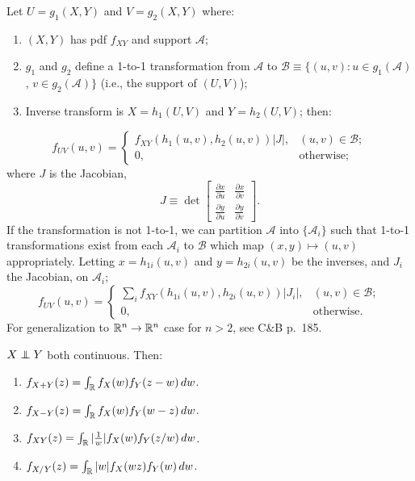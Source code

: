 \documentclass[8pt,letterpaper, landscape]{extarticle} %
\begin{document}
\begin{multicols}{3}
\begin{description}
 Let $ U = g_1 (X,Y) $ and $ V = g_2 (X,Y) $ where:
\begin{enumerate}
\item $ (X,Y) $ has pdf $ f_{XY} $ and support $ \mathcal{A} $;
\item $ g_1 $ and $ g_2 $ define a 1-to-1 transformation from $ \mathcal{A} $ to $ \mathcal{B} \equiv \{ (u,v) \colon u \in g_1(\mathcal{A}) $, $ v \in g_2(\mathcal{A}) \} $ (i.e., the support of $ (U,V) $);
\item Inverse transform is $ X = h_1 (U, V) $ and $ Y = h_2 (U, V) $; then:
\end{enumerate}
$$ f_{UV}(u, v) = \begin{cases}
f_{XY} (h_1(u, v), h_2(u, v)) \left| J \right| , & (u,v) \in \mathcal{B}; \\
0, & \text{otherwise;}
\end{cases} $$
where $ J $ is the Jacobian,
$$ J \equiv \operatorname{det} \begin{bmatrix}
\tfrac{\partial x}{\partial u} & \tfrac{\partial x}{\partial v} \\ 
\tfrac{\partial y}{\partial u} & \tfrac{\partial y}{\partial v}
\end{bmatrix} . $$
If the transformation is not 1-to-1, we can partition $ \mathcal{A} $ into $ \{ \mathcal{A}_i \} $ such that 1-to-1 transformations exist from each $ \mathcal{A}_i $ to $ \mathcal{B} $ which map $ (x,y) \mapsto (u,v) $ appropriately. Letting $ x = h_{1i} (u, v) $ and $ y = h_{2i} (u, v) $ be the inverses, and $ J_i $ the Jacobian, on $ \mathcal{A}_i $;
$$ f_{UV}(u, v) = \begin{cases}
\sum_i f_{XY} (h_{1i}(u, v), h_{2i}(u, v)) \left| J_i \right| , & (u,v) \in \mathcal{B}; \\
0, & \text{otherwise.}
\end{cases} $$
For generalization to $ \mathbb{R}^n \to \mathbb{R}^n $ case for $ n > 2 $, see C\&B p.~185.

 $ X \independent Y $ both continuous. Then:
\begin{enumerate}
\item $ f_{X+Y}(z) = \int_{\mathbb{R}} f_X(w) f_Y(z-w) \, dw $.
\item $ f_{X-Y}(z) = \int_{\mathbb{R}} f_X(w) f_Y(w-z) \, dw $.
\item $ f_{X Y}(z) = \int_{\mathbb{R}} | \tfrac{1}{w} | f_X(w) f_Y(z/w) \, dw $.
\item $ f_{X/Y}(z) = \int_{\mathbb{R}} | w | f_X(wz) f_Y(w) \, dw $.
\end{enumerate}


\end{description}
\end{multicols}
\end{document}
